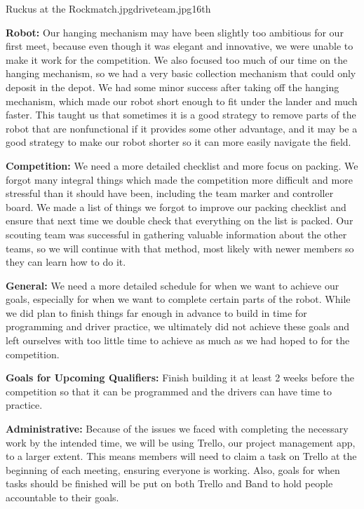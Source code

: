 {Ruckus at the Rock}{match.jpg}{driveteam.jpg}{16th} 
{

	\bigskip

	\textbf{Robot:}  Our hanging mechanism may have been slightly too ambitious for our first meet, because even though it was elegant and innovative, we were unable to make it work for the competition. We also focused too much of our time on the hanging mechanism, so we had a very basic collection mechanism that could only deposit in the depot. We had some minor success after taking off the hanging mechanism, which made our robot short enough to fit under the lander and much faster. This taught us that sometimes it is a good strategy to remove parts of the robot that are nonfunctional if it provides some other advantage, and it may be a good strategy to make our robot shorter so it can more easily navigate the field.

	\bigskip

	\textbf{Competition:} We need a more detailed checklist and more focus on packing. We forgot many integral things which made the competition more difficult and more stressful than it should have been, including the team marker and controller board. We made a list of things we forgot to improve our packing checklist and ensure that next time we double check that everything on the list is packed. Our scouting team was successful in gathering valuable information about the other teams, so we will continue with that method, most likely with newer members so they can learn how to do it. 

	\bigskip

	\textbf{General:} We need a more detailed schedule for when we want to achieve our goals, especially for when we want to complete certain parts of the robot. While we did plan to finish things far enough in advance to build in time for programming and driver practice, we ultimately did not achieve these goals and left ourselves with too little time to achieve as much as we had hoped to for the competition.

	\bigskip

	\textbf{Goals for Upcoming Qualifiers:} Finish building it at least 2 weeks before the competition so that it can be programmed and the drivers can have time to practice.

	\bigskip

	\textbf{Administrative:} Because of the issues we faced with completing the necessary work by the intended time, we will be using Trello, our project management app, to a larger extent. This means members will need to claim a task on Trello at the beginning of each meeting, ensuring everyone is working. Also, goals for when tasks should be finished will be put on both Trello and Band to hold people accountable to their goals.

}
